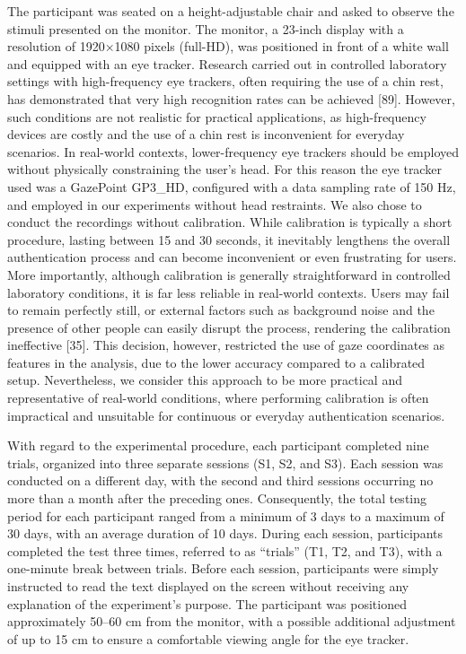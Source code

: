 \documentclass[12pt]{report}
\begin{document}
The participant was seated on a height-adjustable chair and asked to observe the stimuli presented on the monitor. 
The monitor, a 23-inch display with a resolution of 1920×1080 pixels (full-HD), was positioned in front of a white wall and equipped with an eye tracker. 
Research carried out in controlled laboratory settings with high-frequency eye trackers, often requiring the use of a chin rest, has demonstrated that very high recognition rates can be achieved [89].
However, such conditions are not realistic for practical applications, as high-frequency devices are costly and the use of a chin rest is inconvenient for everyday scenarios. 
In real-world contexts, lower-frequency eye trackers should be employed without physically constraining the user's head. 
For this reason the eye tracker used was a GazePoint GP3\_HD, configured with a data sampling rate of 150 Hz, and employed in our experiments without head restraints.
We also chose to conduct the recordings without calibration. 
While calibration is typically a short procedure, lasting between 15 and 30 seconds, it inevitably lengthens the overall authentication process and can become inconvenient or even frustrating for users. 
More importantly, although calibration is generally straightforward in controlled laboratory conditions, it is far less reliable in real-world contexts. 
Users may fail to remain perfectly still, or external factors such as background noise and the presence of other people can easily disrupt the process, rendering the calibration ineffective [35].
This decision, however, restricted the use of gaze coordinates as features in the analysis, due to the lower accuracy compared to a calibrated setup.
Nevertheless, we consider this approach to be more practical and representative of real-world conditions, where performing calibration is often impractical and unsuitable for continuous or everyday authentication scenarios.

With regard to the experimental procedure, each participant completed nine trials, organized into three separate sessions (S1, S2, and S3).
Each session was conducted on a different day, with the second and third sessions occurring no more than a month after the preceding ones. 
Consequently, the total testing period for each participant ranged from a minimum of 3 days to a maximum of 30 days, with an average duration of 10 days.
During each session, participants completed the test three times, referred to as “trials” (T1, T2, and T3), with a one-minute break between trials. 
Before each session, participants were simply instructed to read the text displayed on the screen without receiving any explanation of the experiment's purpose.
The participant was positioned approximately 50–60 cm from the monitor, with a possible additional adjustment of up to 15 cm to ensure a comfortable viewing angle for the eye tracker.
\end{document}
